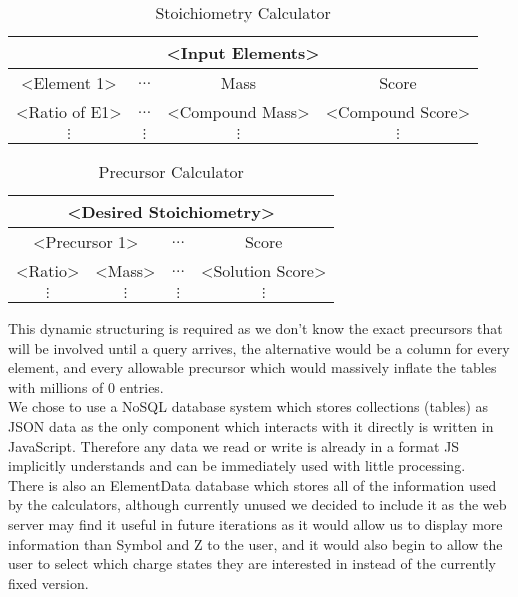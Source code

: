 \begin{table}[H]
\centering
\begin{tabular}{|c|c|c|c|}
	\hline
	\multicolumn{4}{|c|}{\textless{}Input Elements\textgreater{}} \\ \hline
	\textless{}Element 1\textgreater{} & $\dots$ & Mass & Score \\ \hline
	\textless{}Ratio of E1\textgreater{} & $\dots$ & \textless{}Compound Mass\textgreater{} & \textless{}Compound Score\textgreater{}\\
	$\vdots$ & $\vdots$ & $\vdots$ & $\vdots$ \\
\end{tabular}

\caption{Stoichiometry Calculator}
\end{table}

\begin{table}[H]
	\centering
	\begin{tabular}{|c|c|c|c|}
		\hline
		\multicolumn{4}{|c|}{\textless{}Desired Stoichiometry\textgreater{}} \\ \hline
		\multicolumn{2}{|c|}{\textless{}Precursor 1\textgreater{}} & $\dots$ & Score \\ \hline
		\textless{}Ratio\textgreater{} & \textless{}Mass\textgreater{} & $\dots$ & \textless{}Solution Score\textgreater{} \\
		$\vdots$ & $\vdots$ & $\vdots$ & $\vdots$ \\
	\end{tabular}

\caption{Precursor Calculator}
\end{table}

This dynamic structuring is required as we don't know the exact precursors that will be involved until a query arrives, the alternative would be a column for every element, and every allowable precursor which would massively inflate the tables with millions of $0$ entries. \\

We chose to use a NoSQL database system which stores collections (tables) as JSON data as the only component which interacts with it directly is written in JavaScript. Therefore any data we read or write is already in a format JS implicitly understands and can be immediately used with little processing. \\

There is also an ElementData database which stores all of the information used by the calculators, although currently unused we decided to include it as the web server may find it useful in future iterations as it would allow us to display more information than Symbol and Z to the user, and it would also begin to allow the user to select which charge states they are interested in instead of the currently fixed version. 

